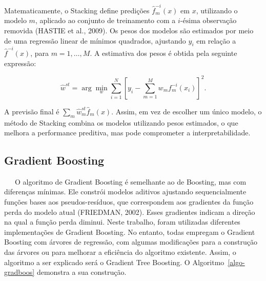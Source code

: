 \documentclass[
  12pt,
  a4paper,
]{scrreprt}
\begin{document}
\vspace{12pt}

Matematicamente, o Stacking define predições
\(\hat{f}_m^{-i}\left(x\right)\) em \(x\), utilizando o modelo \(m\),
aplicado ao conjunto de treinamento com a \(i\text{-ésima}\) observação
removida (HASTIE et al., 2009). Os pesos dos modelos são estimados por
meio de uma regressão linear de mínimos quadrados, ajustando \(y_i\) em
relação a \(\hat{f}^{-i}\left(x\right)\), para \(m=1,\dots,M\). A
estimativa dos pesos é obtida pela seguinte expressão:

\[
\hat{w}^{st} = \arg \min_{w} \sum^{N}_{i = 1} \left[y_i - \sum^{M}_{m = 1} w_m f^{-i}_m\left(x_i\right)\right]^2\text{.}
\]

A previsão final é \(\sum_{m} \hat{w}_m^{st} \hat{f}_m\left(x\right)\).
Assim, em vez de escolher um único modelo, o método de Stacking combina
os modelos utilizando pesos estimados, o que melhora a performance
preditiva, mas pode comprometer a interpretabilidade.

\subsection{Gradient Boosting}\label{gradient-boosting}

~~~O algoritmo de Gradient Boosting é semelhante ao de Boosting, mas com
diferenças mínimas. Ele constrói modelos aditivos ajustando
sequencialmente funções bases aos pseudos-resíduos, que correspondem aos
gradientes da função perda do modelo atual (FRIEDMAN, 2002). Esses
gradientes indicam a direção na qual a função perda diminui. Neste
trabalho, foram utilizadas diferentes implementações de Gradient
Boosting. No entanto, todas empregam o Gradient Boosting com árvores de
regressão, com algumas modificações para a construção das árvores ou
para melhorar a eficiência do algoritmo existente. Assim, o algoritmo a
ser explicado será o Gradient Tree Boosting. O
 Algoritmo~\ref{algo-gradboos}  demonstra a sua construção.
\end{document}
